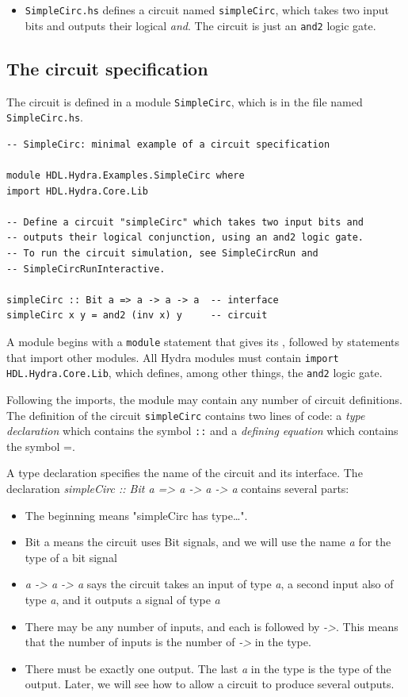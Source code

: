 \documentclass[]{svmono}
\begin{document}
\begin{itemize}
\item \texttt{SimpleCirc.hs} defines a circuit named \texttt{simpleCirc}, which takes
two input bits and outputs their logical \emph{and}.  The circuit is just
an \texttt{and2} logic gate.
\end{itemize}
\subsection*{The circuit specification}
\label{sec:orge042e9d}

The circuit is defined in a module \texttt{SimpleCirc}, which is in the file
named \texttt{SimpleCirc.hs}.

\begin{verbatim}
-- SimpleCirc: minimal example of a circuit specification

module HDL.Hydra.Examples.SimpleCirc where
import HDL.Hydra.Core.Lib

-- Define a circuit "simpleCirc" which takes two input bits and
-- outputs their logical conjunction, using an and2 logic gate.
-- To run the circuit simulation, see SimpleCircRun and
-- SimpleCircRunInteractive.

simpleCirc :: Bit a => a -> a -> a  -- interface
simpleCirc x y = and2 (inv x) y     -- circuit
\end{verbatim}

A module begins with a \texttt{module} statement that gives its , followed by
statements that import other modules.  All Hydra modules must contain
\texttt{import HDL.Hydra.Core.Lib}, which defines, among other things, the
\texttt{and2} logic gate.

Following the imports, the module may contain any number of circuit
definitions.  The definition of the circuit \texttt{simpleCirc} contains two lines
of code: a \emph{type declaration} which contains the symbol \texttt{::} and a
\emph{defining equation} which contains the symbol =.

A type declaration specifies the name of the circuit and its
interface.  The declaration \emph{simpleCirc :: Bit a => a -> a -> a} contains
several parts:

\begin{itemize}
\item The beginning  means "simpleCirc has type\ldots{}".
\item Bit a    means the circuit uses Bit signals, and we will use the
name \emph{a} for the type of a bit signal
\item \emph{a -> a -> a} says the circuit takes an input of type \emph{a}, a second
input also of type \emph{a}, and it outputs a signal of type \emph{a}
\item There may be any number of inputs, and each is followed by \emph{->}.
This means that the number of inputs is the number of \emph{->} in the
type.
\item There must be exactly one output.  The last \emph{a} in the type is the
type of the output.  Later, we will see how to allow a circuit to
produce several outputs.
\end{itemize}
\end{document}
